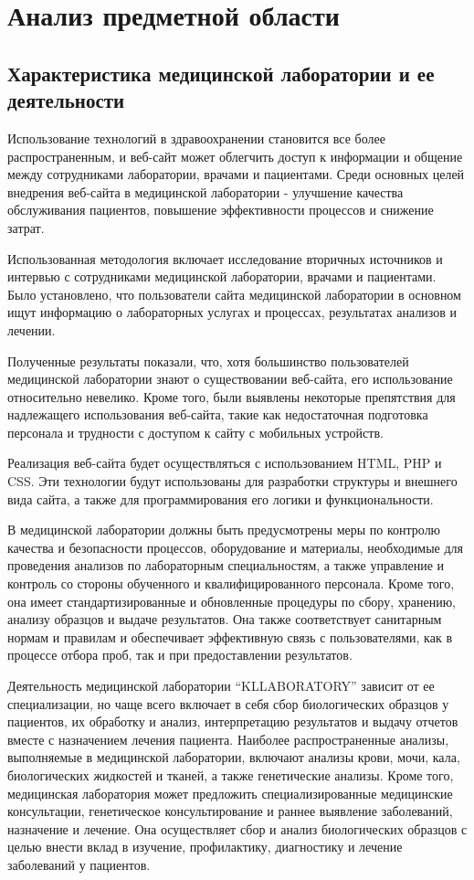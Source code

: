 \newsection
\section{Анализ предметной области}
\subsection{Характеристика медицинской лаборатории и ее деятельности}

Использование технологий в здравоохранении становится все более распространенным, и веб-сайт может облегчить доступ к информации и общение между сотрудниками лаборатории, врачами и пациентами. Среди основных целей внедрения веб-сайта в медицинской лаборатории - улучшение качества обслуживания пациентов, повышение эффективности процессов и снижение затрат.

Использованная методология включает исследование вторичных источников и интервью с сотрудниками медицинской лаборатории, врачами и пациентами. Было установлено, что пользователи сайта медицинской лаборатории в основном ищут информацию о лабораторных услугах и процессах, результатах анализов и лечении.

Полученные результаты показали, что, хотя большинство пользователей медицинской лаборатории знают о существовании веб-сайта, его использование относительно невелико. Кроме того, были выявлены некоторые препятствия для надлежащего использования веб-сайта, такие как недостаточная подготовка персонала и трудности с доступом к сайту с мобильных устройств.

Реализация веб-сайта будет осуществляться с использованием HTML, PHP и CSS. Эти технологии будут использованы для разработки структуры и внешнего вида сайта, а также для программирования его логики и функциональности.

В медицинской лаборатории должны быть предусмотрены меры по контролю качества и безопасности процессов, оборудование и материалы, необходимые для проведения анализов по лабораторным специальностям, а также управление и контроль со стороны обученного и квалифицированного персонала. Кроме того, она имеет стандартизированные и обновленные процедуры по сбору, хранению, анализу образцов и выдаче результатов. Она также соответствует санитарным нормам и правилам и обеспечивает эффективную связь с пользователями, как в процессе отбора проб, так и при предоставлении результатов.

Деятельность медицинской лаборатории ``KLLABORATORY'' зависит от ее специализации, но чаще всего включает в себя сбор биологических образцов у пациентов, их обработку и анализ, интерпретацию результатов и выдачу отчетов вместе с назначением лечения пациента. Наиболее распространенные анализы, выполняемые в медицинской лаборатории, включают анализы крови, мочи, кала, биологических жидкостей и тканей, а также генетические анализы. Кроме того, медицинская лаборатория может предложить специализированные медицинские консультации, генетическое консультирование и раннее выявление заболеваний, назначение и лечение. Она осуществляет сбор и анализ биологических образцов с целью внести вклад в изучение, профилактику, диагностику и лечение заболеваний у пациентов.


